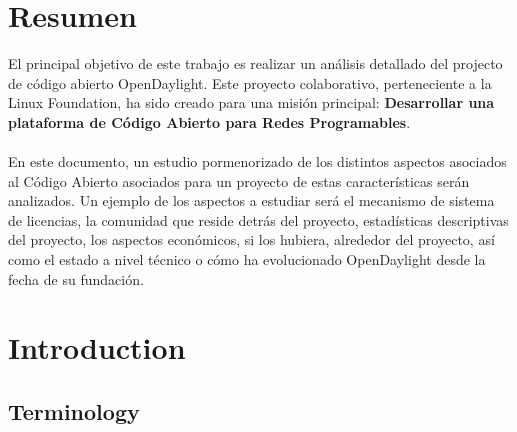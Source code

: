 \documentclass[a4paper, 12pt]{book}
\begin{document}
\chapter*{Resumen}
\label{chap:resumen}

El principal objetivo de este trabajo es realizar un análisis detallado del projecto de código abierto OpenDaylight. Este proyecto colaborativo, perteneciente a la Linux Foundation, ha sido creado para una misión principal: \textbf{Desarrollar una plataforma de Código Abierto para Redes Programables}.\\
\\
En este documento, un estudio pormenorizado de los distintos aspectos asociados al Código Abierto asociados para un proyecto de estas características serán analizados. Un ejemplo de los aspectos a estudiar será el mecanismo de sistema de licencias, la comunidad que reside detrás del proyecto, estadísticas descriptivas del proyecto, los aspectos económicos, si los hubiera, alrededor del proyecto, así como el estado a nivel técnico o cómo ha evolucionado OpenDaylight desde la fecha de su fundación.


\chapter{Introduction}
\label{chap:introduction}

\section{Terminology}
\label{sec:terminology}
\end{document}
